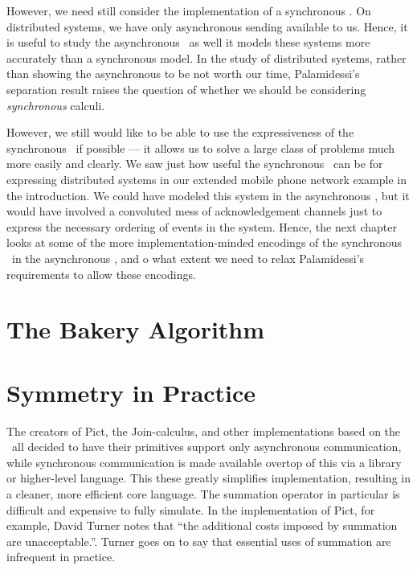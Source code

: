 However, we need still consider the implementation of a synchronous \picalc.  
On distributed systems, we have only asynchronous sending available to us.  
Hence, it is useful to study the asynchronous \picalc\ as well it models these systems more accurately than a synchronous model.
In the study of distributed systems, rather than showing the asynchronous to be not worth our time, Palamidessi's separation result raises the question of whether we should be considering \emph{synchronous} calculi. 

However, we still would like to be able to use the expressiveness of the synchronous \picalc\ if possible --- it allows us to solve a large class of problems much more easily and clearly.
We saw just how useful the synchronous \picalc\ can be for expressing distributed systems in our extended mobile phone network example in the introduction.
We could have modeled this system in the asynchronous \picalc, but it would have involved a convoluted mess of acknowledgement channels just to express the necessary ordering of events in the system.
Hence, the next chapter looks at some of the more implementation-minded encodings of the synchronous \picalc\ in the asynchronous \picalc, and o what extent we need to relax Palamidessi's requirements to allow these encodings.

\section{The Bakery Algorithm}


\section{Symmetry in Practice}
The creators of Pict, the Join-calculus, and other implementations based on the \picalc\ all decided to have their primitives support only asynchronous communication, while synchronous communication is made available overtop of this via a library or higher-level language.  
This these greatly simplifies implementation, resulting in a cleaner, more efficient core language.  
The summation operator in particular is difficult and expensive to fully simulate.  
In the implementation of Pict, for example, David Turner notes \cite{turner96} that ``the additional costs imposed by summation are unacceptable.''.  
Turner goes on to say that essential uses of summation are infrequent in practice.

